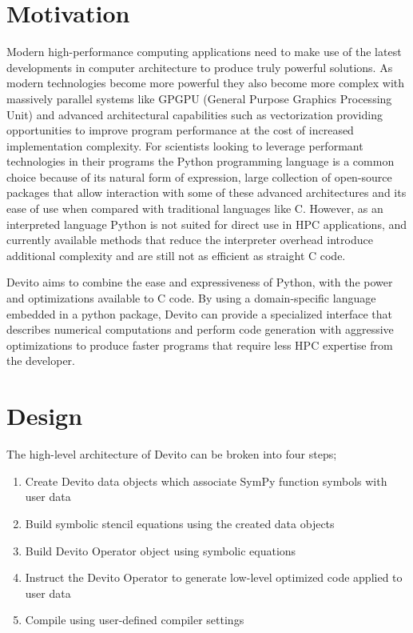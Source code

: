 \documentclass[a4paper,12pt,twoside]{report}
\begin{document}
\section{Motivation}
Modern high-performance computing applications need to make use of the latest developments in computer architecture to produce truly
powerful solutions. As modern technologies become more powerful they also become more complex with massively parallel systems like
GPGPU (General Purpose Graphics Processing Unit) and advanced architectural capabilities such as vectorization providing opportunities
to improve program performance at the cost of increased implementation complexity. For scientists looking to leverage performant
technologies in their programs the Python programming language is a common choice because of its natural form of expression,
large collection of open-source packages that allow interaction with some of these advanced architectures and its ease of use when compared with traditional languages like C.
However, as an interpreted language Python is not suited for direct use in HPC applications, and currently available methods that reduce the interpreter overhead introduce
additional complexity and are still not as efficient as straight C code. 

Devito aims to combine the ease and expressiveness of Python, with the 
power and optimizations available to C code. By using a domain-specific language embedded in a python package, Devito can provide a specialized interface
that describes numerical computations and perform code generation with aggressive optimizations to produce faster programs that require less HPC expertise
from the developer.

\section{Design}
The high-level architecture of Devito can be broken into four steps;
\begin{enumerate}
    \item Create Devito data objects which associate SymPy function symbols with user data
    \item Build symbolic stencil equations using the created data objects
    \item Build Devito Operator object using symbolic equations
    \item Instruct the Devito Operator to generate low-level optimized code applied to user data
    \item Compile using user-defined compiler settings
\end{enumerate}
\end{document}
